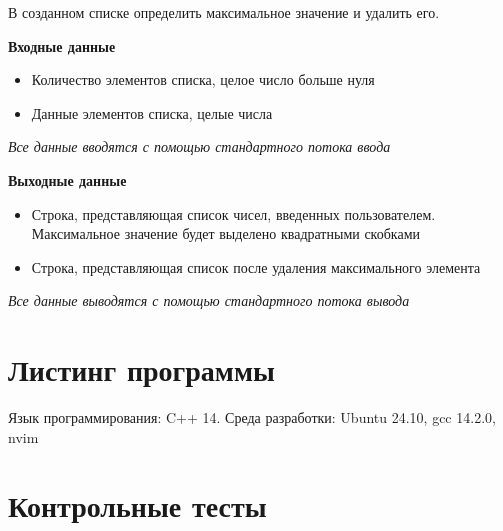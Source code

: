 \documentclass[a4paper,12pt]{article}
\begin{document}
	В созданном списке определить максимальное значение и удалить его.
	
	\textbf{Входные данные}
	
	\begin{itemize}
		\item Количество элементов списка, целое число больше нуля
		\item Данные элементов списка, целые числа
	\end{itemize}
	
	\textit{Все данные вводятся с помощью стандартного потока ввода}
	
	\textbf{Выходные данные}
	
	\begin{itemize}
		\item Строка, представляющая список чисел, введенных пользователем. Максимальное значение будет выделено квадратными скобками
		\item Строка, представляющая список после удаления максимального элемента
	\end{itemize}
	
	\textit{Все данные выводятся с помощью стандартного потока вывода}
	
	\newpage
	\section{Листинг программы}
	Язык программирования: C++ 14. Среда разработки: Ubuntu 24.10, gcc 14.2.0, nvim
	
	
	\newpage
	\section{Контрольные тесты}
	
	\renewcommand{\arraystretch}{1.5} %
\end{document}
